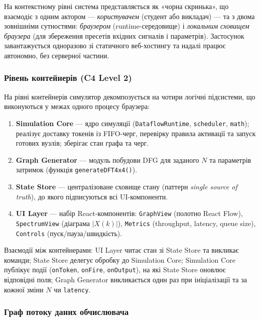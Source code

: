 \documentclass[14pt,a4paper]{extarticle}
\begin{document}
На контекстному рівні система представляється як «чорна скринька»,
що взаємодіє з одним актором --- \emph{користувачем} (студент або
викладач) --- та з двома зовнішніми сутностями: \emph{браузером}
(runtime-середовище) і \emph{локальним сховищем браузера} (для
збереження пресетів вхідних сигналів і параметрів). Застосунок
завантажується одноразово зі статичного веб-хостингу та надалі
працює автономно, без серверної частини.

\subsubsection*{Рівень контейнерів (C4 Level 2)}

На рівні контейнерів симулятор декомпозується на чотири логічні
підсистеми, що виконуються у межах одного процесу браузера:

\begin{enumerate}
  \item \textbf{Simulation Core} --- ядро симуляції
        (\texttt{DataflowRuntime}, \texttt{scheduler}, \texttt{math});
        реалізує доставку токенів із FIFO-черг, перевірку правила
        активації та запуск готових вузлів; зберігає стан графа та
        черг.
  \item \textbf{Graph Generator} --- модуль побудови DFG для заданого
        $N$ та параметрів затримок (функція
        \texttt{generateDFT4x4()}).
  \item \textbf{State Store} --- централізоване сховище стану
        (паттерн \textit{single source of truth}), до якого
        підписуються всі UI-компоненти.
  \item \textbf{UI Layer} --- набір React-компонентів:
        \texttt{GraphView} (полотно React Flow), \texttt{SpectrumView}
        (діаграма $|X(k)|$), \texttt{Metrics} (throughput, latency,
        queue size), \texttt{Controls} (пуск/пауза/швидкість).
\end{enumerate}

Взаємодії між контейнерами: UI Layer читає стан зі State Store та
викликає команди; State Store делегує обробку до Simulation Core;
Simulation Core публікує події (\texttt{onToken}, \texttt{onFire},
\texttt{onOutput}), на які State Store оновлює відповідні поля;
Graph Generator викликається один раз при ініціалізації та за кожної
зміни $N$ чи \texttt{latency}.

\subsubsection*{Граф потоку даних обчислювача}
\end{document}
